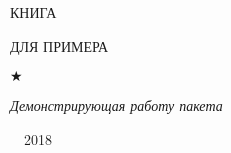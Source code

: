 \begin{center}
  \vspace*{20pt}
  \OnehalfSpacing
  
  \fontsize{32pt}{36pt}\selectfont
  КНИГА
  
  \medskip\huge
  ДЛЯ ПРИМЕРА
  
  \vspace{\baselineskip}
  $\bigstar$
  
  \vspace{\baselineskip}
  {\itshape Демонстрирующая работу пакета }
  
  \vfill\normalsize
  ~\textbullet~2018
\end{center}
